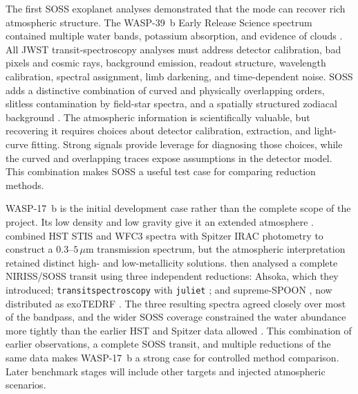 
The first SOSS exoplanet analyses demonstrated that the mode can recover rich
atmospheric structure. The WASP-39~b Early Release Science spectrum contained
multiple water bands, potassium absorption, and evidence of clouds
\citep{FeinsteinEtAl2023}. All JWST transit-spectroscopy analyses must address
detector calibration, bad pixels and cosmic rays, background emission, readout
structure, wavelength calibration, spectral assignment, limb darkening, and
time-dependent noise. SOSS adds a distinctive
combination of curved and physically overlapping orders, slitless contamination
by field-star spectra, and a spatially structured zodiacal background
\citep{BellEtAl2022,RadicaEtAl2023,HolmbergMadhusudhan2023}. The atmospheric
information is scientifically valuable, but recovering it requires choices
about detector calibration, extraction, and light-curve fitting. Strong signals provide
leverage for diagnosing those choices, while the curved and overlapping traces
expose assumptions in the detector model. This combination makes SOSS a useful
test case for comparing reduction methods.


WASP-17~b is the initial development case rather than the complete scope of the
project. Its low density and low gravity give it an extended atmosphere
\citep{AndersonEtAl2010}. \citet{AldersonEtAl2022} combined HST STIS and WFC3
spectra with Spitzer IRAC photometry to construct a
$0.3$--$5\,\mu\mathrm{m}$ transmission spectrum, but the atmospheric
interpretation retained distinct high- and low-metallicity solutions.
\citet{LouieEtAl2025} then analysed a complete NIRISS/SOSS transit using three
independent reductions: Ahsoka, which they introduced;
\texttt{transitspectroscopy} \citep{Espinoza2022TransitSpectroscopy} with
\texttt{juliet} \citep{EspinozaEtAl2019}; and supreme-SPOON
\citep{RadicaEtAl2023}, now distributed as exoTEDRF \citep{Radica2024}. The
three resulting spectra agreed closely over most of the bandpass, and the wider
SOSS coverage constrained the water abundance more tightly than the earlier HST
and Spitzer data allowed \citep{LouieEtAl2025}. This combination of earlier
observations, a complete SOSS transit, and multiple reductions of the same data
makes WASP-17~b a strong case for controlled method comparison. Later benchmark
stages will include other targets and injected atmospheric scenarios.

